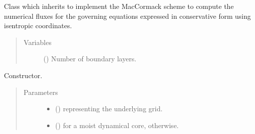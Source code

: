 \documentclass[letterpaper,10pt,english]{sphinxmanual}
\begin{document}

\begin{fulllineitems}
\label{\detokenize{api:dycore.flux_isentropic_maccormack.FluxIsentropicMacCormack}}
Class which inherits {\hyperref[\detokenize{api:dycore.flux_isentropic.FluxIsentropic}]{}} to implement the MacCormack scheme to compute
the numerical fluxes for the governing equations expressed in conservative form using isentropic coordinates.
\begin{quote}\begin{description}
\item[{Variables}] \leavevmode
{\hyperref[\detokenize{api:dycore.prognostic_isentropic.PrognosticIsentropic.nb}]{}} () \textendash{} Number of boundary layers.

\end{description}\end{quote}

\begin{fulllineitems}
\label{\detokenize{api:dycore.flux_isentropic_maccormack.FluxIsentropicMacCormack.__init__}}
Constructor.
\begin{quote}\begin{description}
\item[{Parameters}] \leavevmode\begin{itemize}
\item {} 
 () \textendash{} {\hyperref[\detokenize{api:grids.grid_xyz.GridXYZ}]{}} representing the underlying grid.

\item {} 
 () \textendash{}  for a moist dynamical core,  otherwise.

\end{itemize}

\end{description}\end{quote}


\end{fulllineitems}
\end{fulllineitems}
\end{document}
